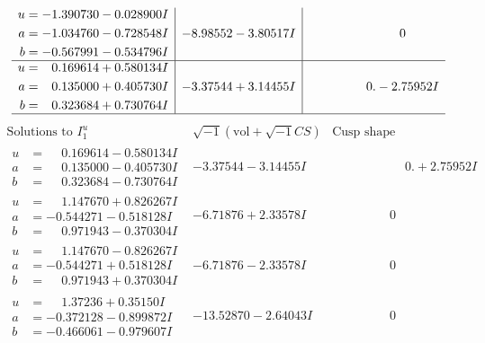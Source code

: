 \documentclass[1p]{elsarticle_modified}
\theoremstyle{definition}
\newcommand{\I}{\sqrt{-1}}
\begin{document}
$$\begin{array}{c|c|c}
\begin{aligned}
u &= -1.390730 - 0.028900 I \\
a &= -1.034760 - 0.728548 I \\
b &= -0.567991 - 0.534796 I\end{aligned}
 & -8.98552 - 3.80517 I & \phantom{-0.000000 } 0 \\ \hline\begin{aligned}
u &= \phantom{-}0.169614 + 0.580134 I \\
a &= \phantom{-}0.135000 + 0.405730 I \\
b &= \phantom{-}0.323684 + 0.730764 I\end{aligned}
 & -3.37544 + 3.14455 I & \phantom{-0.000000 } 0. - 2.75952 I\\
 \hline 
 \end{array}$$\newpage$$\begin{array}{c|c|c}  
\text{Solutions to }I^u_{1}& \I (\text{vol} + \sqrt{-1}CS) & \text{Cusp shape}\\
 \hline 
\begin{aligned}
u &= \phantom{-}0.169614 - 0.580134 I \\
a &= \phantom{-}0.135000 - 0.405730 I \\
b &= \phantom{-}0.323684 - 0.730764 I\end{aligned}
 & -3.37544 - 3.14455 I & \phantom{-0.000000 -}0. + 2.75952 I \\ \hline\begin{aligned}
u &= \phantom{-}1.147670 + 0.826267 I \\
a &= -0.544271 - 0.518128 I \\
b &= \phantom{-}0.971943 - 0.370304 I\end{aligned}
 & -6.71876 + 2.33578 I & \phantom{-0.000000 } 0 \\ \hline\begin{aligned}
u &= \phantom{-}1.147670 - 0.826267 I \\
a &= -0.544271 + 0.518128 I \\
b &= \phantom{-}0.971943 + 0.370304 I\end{aligned}
 & -6.71876 - 2.33578 I & \phantom{-0.000000 } 0 \\ \hline\begin{aligned}
u &= \phantom{-}1.37236 + 0.35150 I \\
a &= -0.372128 - 0.899872 I \\
b &= -0.466061 - 0.979607 I\end{aligned}
 & -13.52870 - 2.64043 I & \phantom{-0.000000 } 0 \\ \hline\begin{aligned}

\end{aligned}
\end{array}$$
\end{document}
